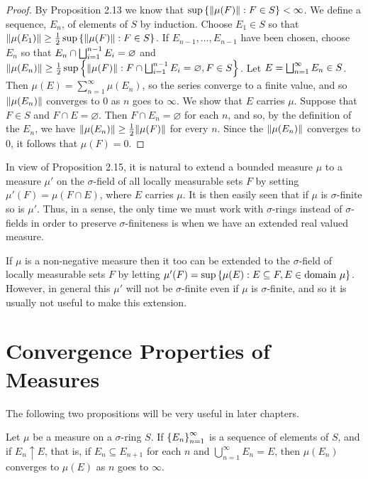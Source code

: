 \begin{proof}
By Proposition 2.13 we know that $\sup\left\{\norm{\mu(F)}: F \in S\right\}<\infty$. We define a sequence, $E_n$, of elements of $S$ by induction. Choose $E_1 \in S$ so that $\norm{\mu(E_1)}\geq\frac12 \sup\left\{\norm{\mu(F)}: F \in S\right\}$. If $E_{n-1}, \dots, E_{n-1}$ have been chosen, choose $E_{n}$ so that $E_n \cap \bigsqcup_{i=1}^{n-1}E_{i}=\varnothing$ and $\norm{\mu(E_n)}\geq \frac12\sup\left\{\norm{\mu(F)}: F\cap\bigsqcup_{i=1}^{n-1}E_i=\varnothing,F\in S\right\}$. Let $E=\bigsqcup_{n=1}^{\infty} E_n \in S$. Then $\mu(E)=\sum_{n=1}^{\infty} \mu(E_{n})$, so the series converge to a finite value, and so $\norm{\mu(E_n)}$ converges to $0$ as $n$ goes to $\infty$. We show that $E$ carries $\mu$. Suppose that $F\in S$ and $F\cap E=\varnothing$. Then $F\cap E_n=\varnothing$ for each $n$, and so, by the definition of the $E_n$, we have $\norm{\mu(E_n)}\geq\frac12\norm{\mu(F)}$ for every $n$. Since the $\norm{\mu(E_n)}$ converges to $0$, it follows that $\mu(F)=0$.
\end{proof} %

In view of Proposition 2.15, it is natural to extend a bounded measure $\mu$ to a measure $\mu'$ on the $\sigma$-field of all locally measurable sets $F$ by setting $\mu'(F)=\mu(F\cap E)$, where $E$ carries $\mu$. It is then easily seen that if $\mu$ is $\sigma$-finite so is $\mu'$. Thus, in a sense, the only time we must work with $\sigma$-rings instead of $\sigma$-fields in order to preserve $\sigma$-finiteness is when we have an extended real valued measure.

If $\mu$ is a non-negative measure then it too can be extended to the $\sigma$-field of locally measurable sets $F$ by letting $\mu'(F)=\sup\left\{\mu(E):E\subseteq F,E\in\text{domain }\mu\right\}$. However, in general this $\mu'$ will not be $\sigma$-finite even if $\mu$ is $\sigma$-finite, and so it is usually not useful to make this extension. 

\section{Convergence Properties of Measures}

The following two propositions will be very useful in later chapters.

\begin{proposition}

Let $\mu$ be a measure on a $\sigma$-ring $S$. If $\left\{E_n\right\}_{n=1}^\infty$ is a sequence of elements of $S$, and if $E_n\uparrow E$, that is, if $E_n\subseteq E_{n+1}$ for each $n$ and $\bigcup_{n=1}^\infty E_n=E$, then $\mu(E_n)$ converges to $\mu(E)$ as $n$ goes to $\infty$. 
\end{proposition}

